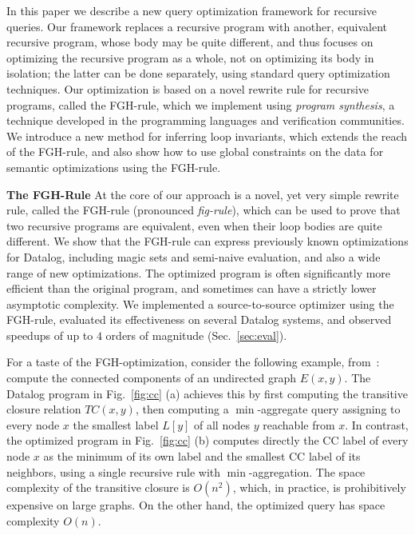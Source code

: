 In this paper we describe a new query optimization framework for
recursive queries.  Our framework replaces a recursive program with
another, equivalent recursive program, whose body may be quite
different, and thus focuses on optimizing the recursive program as a
whole, not on optimizing its body in isolation; the latter can be done
separately, using standard query optimization techniques.  Our
optimization is based on a novel rewrite rule for recursive programs,
called the FGH-rule, which we implement using {\em program synthesis},
a technique developed in the programming languages and verification
communities. We introduce a new method for inferring loop invariants,
which extends the reach of the FGH-rule, and also show how to use
global constraints on the data for semantic optimizations using the
FGH-rule.  


{\bf The FGH-Rule} At the core of our approach is a novel, yet very
simple rewrite rule, called the FGH-rule (pronounced {\em fig-rule}),
which can be used to prove that two recursive programs are equivalent,
even when their loop bodies are quite different.  We show that the
FGH-rule can express previously known optimizations for Datalog,
including magic sets and semi-naive evaluation, and also a wide range
of new optimizations.  The optimized program is often significantly
more efficient than the original program, and sometimes can have a
strictly lower asymptotic complexity.  We implemented a
source-to-source optimizer using the FGH-rule, evaluated its
effectiveness on several Datalog systems, and observed speedups of up
to $4$ orders of magnitude (Sec.~\ref{sec:eval}).

For a taste of the FGH-optimization, consider the following example,
from~\cite{DBLP:journals/tplp/ZanioloYDSCI17,DBLP:conf/amw/ZanioloYIDSC18}:
compute the connected components of an undirected graph $E(x,y)$.  The
Datalog program in Fig.~\ref{fig:cc} (a) achieves this by first
computing the transitive closure relation $TC(x,y)$, then computing a
$\min$-aggregate query
assigning to every node $x$ the smallest label $L[y]$ of all nodes $y$ reachable from $x$.
In contrast, the optimized program in Fig.~\ref{fig:cc} (b)
computes directly the CC label of every node $x$ as the  minimum of its own label
and the smallest CC label of its neighbors,
using a single recursive rule with
$\min$-aggregation.
The space complexity of the transitive closure is
$O(n^2)$, which, in practice, is prohibitively expensive on large graphs.
On the other hand, the optimized query has space complexity $O(n)$.

